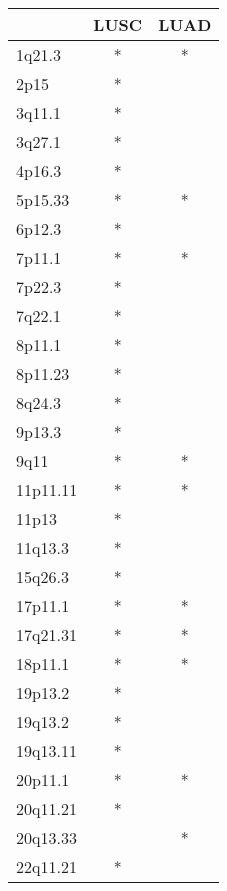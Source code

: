 \begin{tabular}{lcc}
\toprule
{} & LUSC & LUAD \\
\midrule
1q21.3   &    * &    * \\
2p15     &    * &      \\
3q11.1   &    * &      \\
3q27.1   &    * &      \\
4p16.3   &    * &      \\
5p15.33  &    * &    * \\
6p12.3   &    * &      \\
7p11.1   &    * &    * \\
7p22.3   &    * &      \\
7q22.1   &    * &      \\
8p11.1   &    * &      \\
8p11.23  &    * &      \\
8q24.3   &    * &      \\
9p13.3   &    * &      \\
9q11     &    * &    * \\
11p11.11 &    * &    * \\
11p13    &    * &      \\
11q13.3  &    * &      \\
15q26.3  &    * &      \\
17p11.1  &    * &    * \\
17q21.31 &    * &    * \\
18p11.1  &    * &    * \\
19p13.2  &    * &      \\
19q13.2  &    * &      \\
19q13.11 &    * &      \\
20p11.1  &    * &    * \\
20q11.21 &    * &      \\
20q13.33 &      &    * \\
22q11.21 &    * &      \\
\bottomrule
\end{tabular}
